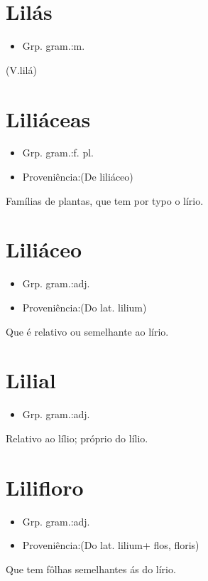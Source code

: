 \section{Lilás}
\begin{itemize}
\item {Grp. gram.:m.}
\end{itemize}
(V.lilá)
\section{Liliáceas}
\begin{itemize}
\item {Grp. gram.:f. pl.}
\end{itemize}
\begin{itemize}
\item {Proveniência:(De \textunderscore liliáceo\textunderscore )}
\end{itemize}
Famílias de plantas, que tem por typo o lírio.
\section{Liliáceo}
\begin{itemize}
\item {Grp. gram.:adj.}
\end{itemize}
\begin{itemize}
\item {Proveniência:(Do lat. \textunderscore lilium\textunderscore )}
\end{itemize}
Que é relativo ou semelhante ao lírio.
\section{Lilial}
\begin{itemize}
\item {Grp. gram.:adj.}
\end{itemize}
Relativo ao lílio; próprio do lílio.
\section{Lilifloro}
\begin{itemize}
\item {Grp. gram.:adj.}
\end{itemize}
\begin{itemize}
\item {Proveniência:(Do lat. \textunderscore lilium\textunderscore  + \textunderscore flos\textunderscore , \textunderscore floris\textunderscore )}
\end{itemize}
Que tem fôlhas semelhantes ás do lírio.

